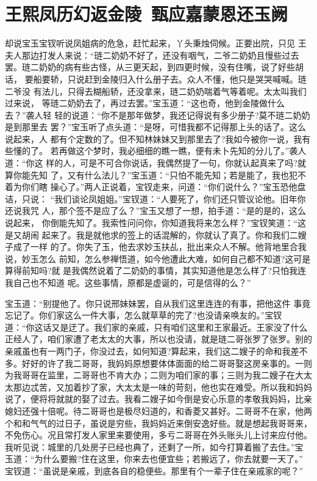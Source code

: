 \chapter{王熙凤历幻返金陵~甄应嘉蒙恩还玉阙}

却说宝玉宝钗听说凤姐病的危急，赶忙起来，丫头秉烛伺候。正要出院，只见
王夫人那边打发人来说：“琏二奶奶不好了，还没有咽气，二爷二奶奶且慢些过去
罢。琏二奶奶的病有些古怪，从三更天起，到四更时候，没有住嘴，说了好些胡话，
要船要轿，只说赶到金陵归入什么册子去。众人不懂，他只是哭哭喊喊。琏二爷没
有法儿，只得去糊船轿，还没拿来，琏二奶奶喘着气等着呢。太太叫我们过来说，
等琏二奶奶去了，再过去罢。”宝玉道：“这也奇，他到金陵做什么去？”袭人轻
轻的说道：“你不是那年做梦，我还记得说有多少册子?莫不琏二奶奶是到那里去
罢？”宝玉听了点头道：“是呀，可惜我都不记得那上头的话了。这么说起来，人
都有个定数的了。但不知林妹妹又到那里去了?我如今被你一说，我有些懂的了。
若再做这个梦时，我必细细的瞧一瞧，便有未卜先知的分儿了。”袭人道：“你这
样的人，可是不可合你说话，我偶然提了一句，你就认起真来了吗?就算你能先知
了，又有什么法儿？”宝玉道：“只怕不能先知；若是能了，我也犯不着为你们瞎
操心了。”两人正说着，宝钗走来，问道：“你们说什么？”宝玉恐他盘诘，只说：
“我们谈论凤姐姐。”宝钗道：“人要死了，你们还只管议论他。旧年你还说我咒
人，那个签不是应了么？”宝玉又想了一想，拍手道：“是的是的，这么说起来，
你倒能先知了。我索性问问你，你知道我将来怎么样？”宝钗笑道：“这是又胡闹
起来了。我是就他求的签上的话混解的，你就认了真了。你和我们二嫂子成了一样
的了。你失了玉，他去求妙玉扶乩，批出来众人不解。他背地里合我说，妙玉怎么
前知，怎么参禅悟道，如今他遭此大难，如何自己都不知道?这可是算得前知吗?就
是我偶然说着了二奶奶的事情，其实知道他是怎么样了?只怕我连我自己也不知道
呢。这些事情，原都是虚诞的，可是信得的么？”

宝玉道：“别提他了。你只说邢妹妹罢，自从我们这里连连的有事，把他这件
事竟忘记了。你们家这么一件大事，怎么就草草的完了?也没请亲唤友的。”宝钗
道：“你这话又是迂了。我们家的亲戚，只有咱们这里和王家最近。王家没了什么
正经人了，咱们家遭了老太太的大事，所以也没请，就是琏二哥张罗了张罗。别的
亲戚虽也有一两门子，你没过去，如何知道?算起来，我们这二嫂子的命和我差不
多。好好的许了我二哥哥，我妈妈原想要体体面面的给二哥哥娶这房亲事的。一则
为我哥哥在监里，二哥哥也不肯大办；二则为咱们家的事；三则为我二嫂子在大太
太那边忒苦，又加着抄了家，大太太是一味的苛刻，他也实在难受。所以我和妈妈
说了，便将将就就的娶了过去。我看二嫂子如今倒是安心乐意的孝敬我妈妈，比亲
媳妇还强十倍呢。待二哥哥也是极尽妇道的，和香菱又甚好。二哥哥不在家，他两
个和和气气的过日子，虽说是穷些，我妈妈近来倒安逸好些。就是想起我哥哥来，
不免伤心。况且常打发人家里来要使用，多亏二哥哥在外头账头儿上讨来应付他。
我听见说：城里的几处房子已经也典了，还剩了一所，如今打算着搬了去住。”宝
玉道：“为什么要搬?住在这里，你来去也便宜些；若搬远了，你去就要一天了。”
宝钗道：“虽说是亲戚，到底各自的稳便些。那里有个一辈子住在亲戚家的呢？”

